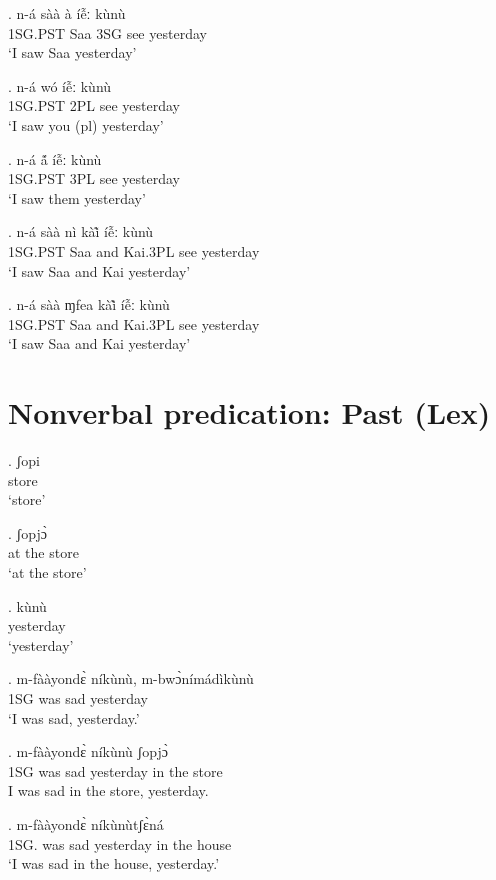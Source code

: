 \documentclass{assets/fieldnotes}
\begin{document}
{\exg. n-á sàà à íễː kùnù\\
1SG.PST Saa 3SG see yesterday \\
    `I saw Saa yesterday'

\exg. n-á wó íễː kùnù \\
1SG.PST 2PL see yesterday \\
    `I saw you (pl) yesterday'

\exg. n-á á̃ íễː kùnù \\
1SG.PST 3PL see yesterday \\
    `I saw them yesterday'

\exg. n-á sàà nì kàì̃ íễː kùnù\\
1SG.PST Saa and Kai.3PL see yesterday \\
    `I saw Saa and Kai yesterday'

\exg. n-á sàà ɱfea kàì̃ íễː kùnù\\
1SG.PST Saa and Kai.3PL see yesterday \\
    `I saw Saa and Kai yesterday'



\section{Nonverbal predication: Past (Lex)}%


\exg. ʃopi\\
store\\
`store'

\exg. ʃopjɔ̀\\
at the store\\
`at the store'

\exg. kùnù\\
yesterday\\
`yesterday'


\exg. m-fààyondɛ̀ níkùnù, m-bwɔ̀nímádìkùnù\\
1SG was sad yesterday\\
`I was sad, yesterday.'

\exg. m-fààyondɛ̀ níkùnù ʃopjɔ̀ \\
1SG was sad yesterday in the store\\
I was sad in the store, yesterday.

\exg. m-fààyondɛ̀ níkùnùtʃɛ̀ná \\
1SG. was sad yesterday in the house\\
`I was sad in the house, yesterday.'

}
\end{document}
